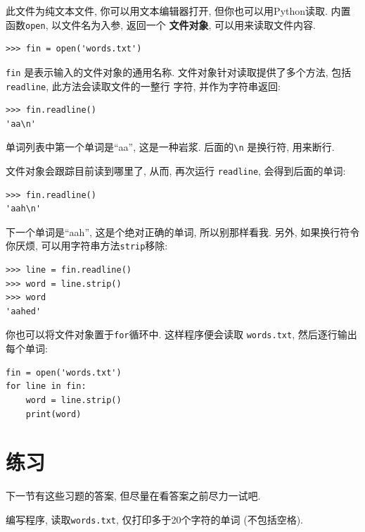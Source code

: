 \documentclass[10pt]{book}
\begin{document}
此文件为纯文本文件, 你可以用文本编辑器打开, 
但你也可以用Python读取. 
内置函数{\tt open}, 以文件名为入参, 返回一个 {\bf 文件对象}, 
可以用来读取文件内容. 

\begin{verbatim}
>>> fin = open('words.txt')
\end{verbatim}
%
{\tt fin} 是表示输入的文件对象的通用名称. 
文件对象针对读取提供了多个方法, 包括 {\tt readline}, 此方法会读取文件的一整行
字符, 并作为字符串返回: 

\begin{verbatim}
>>> fin.readline()
'aa\n'
\end{verbatim}
%
单词列表中第一个单词是``aa'', 这是一种岩浆. 
后面的\verb"\n" 是换行符, 用来断行. 

文件对象会跟踪目前读到哪里了, 从而, 再次运行
{\tt readline}, 会得到后面的单词:

\begin{verbatim}
>>> fin.readline()
'aah\n'
\end{verbatim}
%
下一个单词是``aah'',  这是个绝对正确的单词, 所以别那样看我. 
另外, 如果换行符令你厌烦, 可以用字符串方法{\tt strip}移除:

\begin{verbatim}
>>> line = fin.readline()
>>> word = line.strip()
>>> word
'aahed'
\end{verbatim}
%
你也可以将文件对象置于{\tt for}循环中. 
这样程序便会读取 {\tt words.txt}, 然后逐行输出每个单词:

\begin{verbatim}
fin = open('words.txt')
for line in fin:
    word = line.strip()
    print(word)
\end{verbatim}
%

\section{练习}
下一节有这些习题的答案, 但尽量在看答案之前尽力一试吧. 

\begin{exercise}
编写程序, 读取{\tt words.txt}, 仅打印多于20个字符的单词
(不包括空格). 

\end{exercise}
\end{document}
